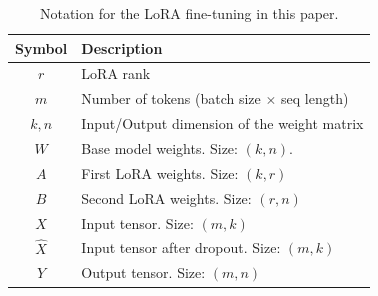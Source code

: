 \begin{table}[t]
    \centering
    \caption{Notation for the LoRA fine-tuning in this paper.}
     \begin{tabularx}{\linewidth}{c X}
     \toprule
     Symbol & Description \\
     \midrule
     $r$ & LoRA rank \\
     $m$ & Number of tokens (batch size $\times$ seq length) \\
     $k, n$ & Input/Output dimension of the weight matrix \\
     \midrule
     $W$ & Base model weights. Size: $(k, n)$. \\
     $A$ & First LoRA weights. Size: $(k, r)$ \\
     $B$ & Second LoRA weights. Size: $(r, n)$ \\
     $X$ & Input tensor. Size: $(m, k)$ \\
     $\widehat{X}$ & Input tensor after dropout. Size: $(m, k)$ \\
     $Y$ & Output tensor. Size: $(m, n)$ \\
     \bottomrule
     \end{tabularx}
    \label{tab:background-tab-1-notation}
\end{table}